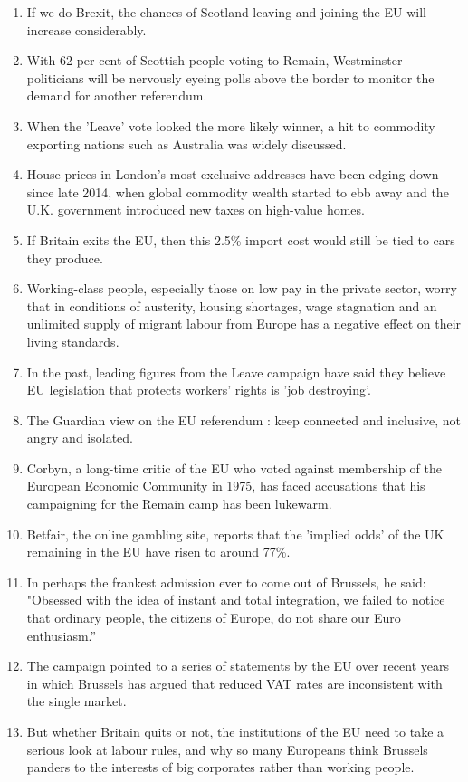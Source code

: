 \documentclass[fleqn,moreauthors,10pt]{ds_report}
\begin{document}
\begin{enumerate}
    \item If we do Brexit, the chances of Scotland leaving and joining the EU will increase considerably.
    \item With 62 per cent of Scottish people voting to Remain, Westminster politicians will be nervously eyeing polls above the border to monitor the demand for another referendum.
    \item When the 'Leave' vote looked the more likely winner, a hit to commodity exporting nations such as Australia was widely discussed.
    \item House prices in London's most exclusive addresses have been edging down since late 2014, when global commodity wealth started to ebb away and the U.K. government introduced new taxes on high-value homes.
    \item If Britain exits the EU, then this 2.5\% import cost would still be tied to cars they produce.
    \item Working-class people, especially those on low pay in the private sector, worry that in conditions of austerity, housing shortages, wage stagnation and an unlimited supply of migrant labour from Europe has a negative effect on their living standards.
    \item In the past, leading figures from the Leave campaign have said they believe EU legislation that protects workers' rights is 'job destroying'.
    \item The Guardian view on the EU referendum : keep connected and inclusive, not angry and isolated.
    \item Corbyn, a long-time critic of the EU who voted against membership of the European Economic Community in 1975, has faced accusations that his campaigning for the Remain camp has been lukewarm.
    \item Betfair, the online gambling site, reports that the 'implied odds' of the UK remaining in the EU have risen to around 77\%.
    \item In perhaps the frankest admission ever to come out of Brussels, he said: "Obsessed with the idea of instant and total integration, we failed to notice that ordinary people, the citizens of Europe, do not share our Euro enthusiasm.”
    \item The campaign pointed to a series of statements by the EU over recent years in which Brussels has argued that reduced VAT rates are inconsistent with the single market.
    \item But whether Britain quits or not, the institutions of the EU need to take a serious look at labour rules, and why so many Europeans think Brussels panders to the interests of big corporates rather than working people.

\end{enumerate}
\end{document}
